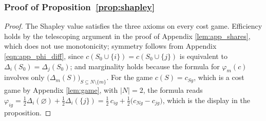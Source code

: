 \documentclass[11 pt]{article}
\begin{document}
\subsubsection{Proof of Proposition~\ref{prop:shapley}}\label{subsec:app_shapley}

\begin{proof}
The Shapley value satisfies the three axioms on every cost game. Efficiency holds by the telescoping argument in the proof of Appendix \autoref{lem:app_shares}, which does not use monotonicity; symmetry follows from Appendix \autoref{eqn:app_phi_diff}, since $c(S_0 \cup \{i\}) = c(S_0 \cup \{j\})$ is equivalent to $\Delta_{i}(S_0) = \Delta_{j}(S_0)$; and marginality holds because the formula for $\varphi_{m}(c)$ involves only $\bigl( \Delta_{m}(S) \bigr)_{S \subseteq N \setminus \{m\}}$. For the game $c(S) = c_{Sg}$, which is a cost game by Appendix \autoref{lem:game}, with $|N| = 2$, the formula reads $\varphi_{ig} = \tfrac{1}{2} \Delta_{i}(\varnothing) + \tfrac{1}{2} \Delta_{i}(\{j\}) = \tfrac{1}{2}\, c_{ig} + \tfrac{1}{2} \bigl( c_{Ng} - c_{jg} \bigr)$, which is the display in the proposition.


\end{proof}
\end{document}
